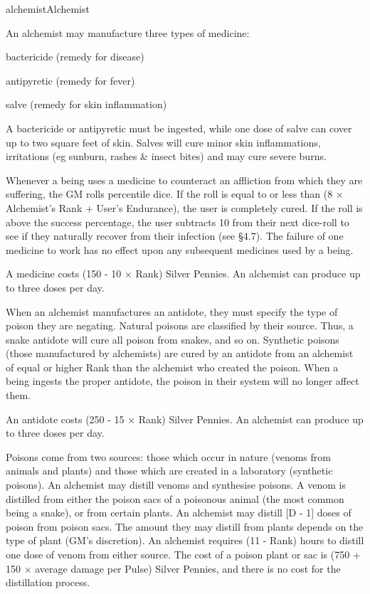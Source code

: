 \begin{Skill}[1.1]{alchemist}{Alchemist}

An alchemist may manufacture three types of medicine:

\begin{Itemize}

\item bactericide (remedy for disease)  

\item antipyretic (remedy for fever)  

\item salve (remedy for skin inflammation) 

\end{Itemize}

A bactericide or antipyretic must be ingested, while one dose of salve
can cover up to two square feet of skin. Salves will cure minor skin
inflammations, irritations (eg sunburn, rashes \& insect bites) and
may cure severe burns.

Whenever a being uses a medicine to counteract an affliction from
which they are suffering, the GM rolls percentile dice.  If the roll
is equal to or less than (8 × Alchemist’s Rank + User’s Endurance),
the user is completely cured. If the roll is above the success
percentage, the user subtracts 10 from their next dice-roll to see if
they naturally recover from their infection (see §4.7). The failure of
one medicine to work has no effect upon any subsequent medicines
used by a being.

A medicine costs (150 - 10 × Rank) Silver Pennies.  An alchemist can
produce up to three doses per day.

When an alchemist manufactures an antidote, they must specify the type
of poison they are negating.  Natural poisons are classified by their
source.  Thus, a snake antidote will cure all poison from snakes, and
so on. Synthetic poisons (those manufactured by alchemists) are cured
by an antidote from an alchemist of equal or higher Rank than the
alchemist who created the poison.  When a being ingests the proper
antidote, the poison in their system will no longer affect them.

An antidote costs (250 - 15 × Rank) Silver Pennies.  An alchemist can
produce up to three doses per day.


Poisons come from two sources: those which occur in nature (venoms
from animals and plants) and those which are created in a laboratory
(synthetic poisons).  An alchemist may distill venoms and synthesise
poisons.  A venom is distilled from either the poison sacs of a
poisonous animal (the most common being a snake), or from certain
plants.  An alchemist may distill [D - 1] doses of poison from poison
sacs.  The amount they may distill from plants depends on the type of
plant (GM’s discretion).  An alchemist requires (11 - Rank) hours to
distill one dose of venom from either source.  The cost of a poison
plant or sac is (750 + 150 × average damage per Pulse) Silver Pennies,
and there is no cost for the distillation process.


\end{Skill}
